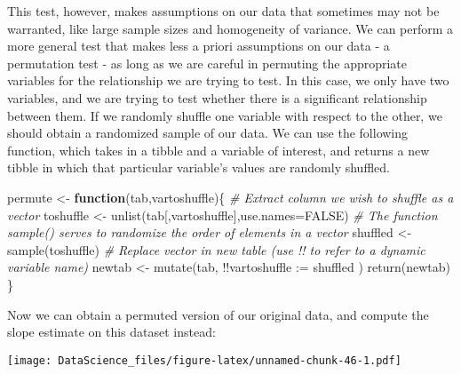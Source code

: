 \documentclass[
]{book}
\newenvironment{Shaded}{\begin{snugshade}}{\end{snugshade}}
\newcommand{\AttributeTok}[1]{\textcolor[rgb]{0.77,0.63,0.00}{#1}}
\newcommand{\CommentTok}[1]{\textcolor[rgb]{0.56,0.35,0.01}{\textit{#1}}}
\newcommand{\ConstantTok}[1]{\textcolor[rgb]{0.00,0.00,0.00}{#1}}
\newcommand{\ControlFlowTok}[1]{\textcolor[rgb]{0.13,0.29,0.53}{\textbf{#1}}}
\newcommand{\FunctionTok}[1]{\textcolor[rgb]{0.00,0.00,0.00}{#1}}
\newcommand{\NormalTok}[1]{#1}
\newcommand{\OtherTok}[1]{\textcolor[rgb]{0.56,0.35,0.01}{#1}}
\newcommand{\SpecialCharTok}[1]{\textcolor[rgb]{0.00,0.00,0.00}{#1}}
\newcommand{\StringTok}[1]{\textcolor[rgb]{0.31,0.60,0.02}{#1}}
\begin{document}
This test, however, makes assumptions on our data that sometimes may not be warranted, like large sample sizes and homogeneity of variance. We can perform a more general test that makes less a priori assumptions on our data - a permutation test - as long as we are careful in permuting the appropriate variables for the relationship we are trying to test. In this case, we only have two variables, and we are trying to test whether there is a significant relationship between them. If we randomly shuffle one variable with respect to the other, we should obtain a randomized sample of our data. We can use the following function, which takes in a tibble and a variable of interest, and returns a new tibble in which that particular variable's values are randomly shuffled.

\begin{Shaded}
\begin{Highlighting}[]
\NormalTok{permute }\OtherTok{\textless{}{-}} \ControlFlowTok{function}\NormalTok{(tab,vartoshuffle)\{}
  \CommentTok{\# Extract column we wish to shuffle as a vector}
\NormalTok{  toshuffle }\OtherTok{\textless{}{-}} \FunctionTok{unlist}\NormalTok{(tab[,vartoshuffle],}\AttributeTok{use.names=}\ConstantTok{FALSE}\NormalTok{)}
  \CommentTok{\# The function sample() serves to randomize the order of elements in a vector}
\NormalTok{  shuffled }\OtherTok{\textless{}{-}} \FunctionTok{sample}\NormalTok{(toshuffle)}
  \CommentTok{\# Replace vector in new table (use !! to refer to a dynamic variable name)}
\NormalTok{  newtab }\OtherTok{\textless{}{-}} \FunctionTok{mutate}\NormalTok{(tab, }\SpecialCharTok{!!}\AttributeTok{vartoshuffle :=}\NormalTok{ shuffled )}
  \FunctionTok{return}\NormalTok{(newtab)}
\NormalTok{\}}
\end{Highlighting}
\end{Shaded}

Now we can obtain a permuted version of our original data, and compute the slope estimate on this dataset instead:

\begin{Shaded}
\end{Shaded}

\texttt{[image: DataScience\_files/figure-latex/unnamed-chunk-46-1.pdf]}
\end{document}
